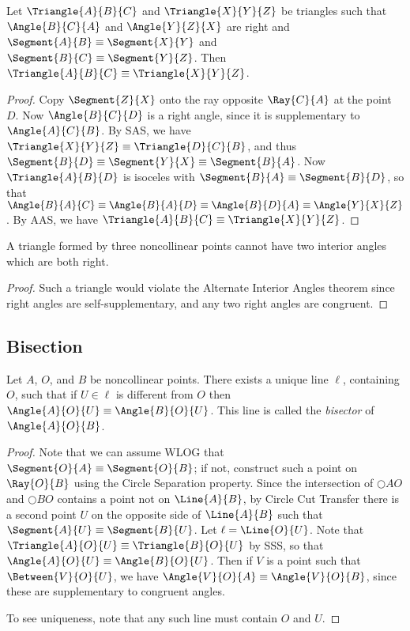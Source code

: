 \documentclass{article}
\begin{document}
\begin{prop}[HL]
Let $\Triangle{A}{B}{C}$ and $\Triangle{X}{Y}{Z}$ be triangles such that $\Angle{B}{C}{A}$ and $\Angle{Y}{Z}{X}$ are right and $\Segment{A}{B} \equiv \Segment{X}{Y}$ and $\Segment{B}{C} \equiv \Segment{Y}{Z}$. Then $\Triangle{A}{B}{C} \equiv \Triangle{X}{Y}{Z}$.
\end{prop}

\begin{proof}
Copy $\Segment{Z}{X}$ onto the ray opposite $\Ray{C}{A}$ at the point $D$. Now $\Angle{B}{C}{D}$ is a right angle, since it is supplementary to $\Angle{A}{C}{B}$. By SAS, we have $\Triangle{X}{Y}{Z} \equiv \Triangle{D}{C}{B}$, and thus $\Segment{B}{D} \equiv \Segment{Y}{X} \equiv \Segment{B}{A}$. Now $\Triangle{A}{B}{D}$ is isoceles with $\Segment{B}{A} \equiv \Segment{B}{D}$, so that $\Angle{B}{A}{C} \equiv \Angle{B}{A}{D} \equiv \Angle{B}{D}{A} \equiv \Angle{Y}{X}{Z}$. By AAS, we have $\Triangle{A}{B}{C} \equiv \Triangle{X}{Y}{Z}$.
\end{proof}

\begin{prop}
A triangle formed by three noncollinear points cannot have two interior angles which are both right.
\end{prop}

\begin{proof}
Such a triangle would violate the Alternate Interior Angles theorem since right angles are self-supplementary, and any two right angles are congruent.
\end{proof}

\subsection*{Bisection}

\begin{construct}
Let $A$, $O$, and $B$ be noncollinear points. There exists a unique line $\ell$, containing $O$, such that if $U \in \ell$ is different from $O$ then $\Angle{A}{O}{U} \equiv \Angle{B}{O}{U}$. This line is called the \emph{bisector} of $\Angle{A}{O}{B}$.
\end{construct}

\begin{proof}
Note that we can assume WLOG that $\Segment{O}{A} \equiv \Segment{O}{B}$; if not, construct such a point on $\Ray{O}{B}$ using the Circle Separation property. Since the intersection of $\Circle{A}{O}$ and $\Circle{B}{O}$ contains a point not on $\Line{A}{B}$, by Circle Cut Transfer there is a second point $U$ on the opposite side of $\Line{A}{B}$ such that $\Segment{A}{U} \equiv \Segment{B}{U}$. Let $\ell = \Line{O}{U}$. Note that $\Triangle{A}{O}{U} \equiv \Triangle{B}{O}{U}$ by SSS, so that $\Angle{A}{O}{U} \equiv \Angle{B}{O}{U}$. Then if $V$ is a point such that $\Between{V}{O}{U}$, we have $\Angle{V}{O}{A} \equiv \Angle{V}{O}{B}$, since these are supplementary to congruent angles.

To see uniqueness, note that any such line must contain $O$ and $U$.
\end{proof}
\end{document}
